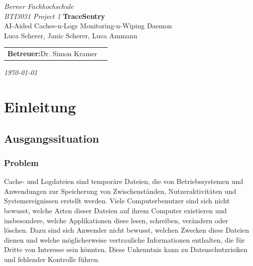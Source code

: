 \documentclass[a4paper,12pt]{report}
\begin{document}
    \begin{titlepage}
        \centering
        \textit{Berner Fachhochschule}\\[0.2em]
        \textit{BTI3031 Project 1}
        \vfill
        {\huge \textbf{TraceSentry}}\\[1em]
        {\Large AI-Aided Caches-n-Logs Monitoring-n-Wiping Daemon}\\[4em]
        {\large Luca Scherer, Janic Scherer, Luca Ammann}\\[0.5em]
        \begin{tabular}{ll}
            \textbf{Betreuer:}\hspace{0.5em}Dr. Simon Kramer \\
        \end{tabular}

        \vfill
        \textit{\today}
    \end{titlepage}


    \begin{abstract}
        \ldots
    \end{abstract}

    \tableofcontents
    \listoftables
    \listoffigures
    \lstlistoflistings



    \chapter{Einleitung}


    \section{Ausgangssituation}

    \subsection{Problem}\label{subsec:problem}
    Cache- und Logdateien sind temporäre Dateien, die von Betriebssystemen und
    Anwendungen zur Speicherung von Zwischenständen, Nutzeraktivitäten und
    Systemereignissen erstellt werden.
    Viele Computerbenutzer sind sich nicht bewusst, welche Arten dieser Dateien auf ihrem
    Computer existieren und insbesondere, welche Applikationen diese lesen, schreiben,
    verändern oder löschen.
    Dazu sind sich Anwender nicht bewusst, welchen Zwecken
    diese Dateien dienen und welche möglicherweise vertrauliche Informationen enthalten,
    die für Dritte von Interesse sein könnten.
    Diese Unkenntnis kann zu Datenschutzrisiken
    und fehlender Kontrolle führen.
\end{document}
